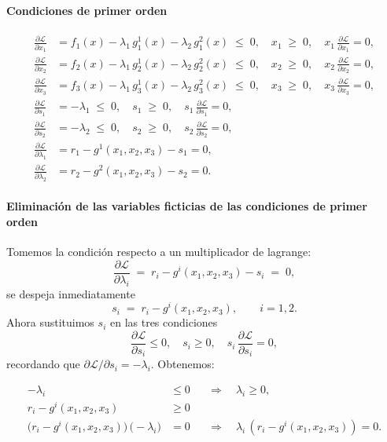 \documentclass{article}
\begin{document}
\bigskip
\paragraph{Condiciones de primer orden}

\[
\begin{aligned}
\frac{\partial\mathcal L}{\partial x_1}
&= f_{1}(x)-\lambda_1\,g^1_{1}(x)-\lambda_2\,g^2_{1}(x)
\;\le\;0,\quad
x_1\;\ge\;0,\quad
x_1\,\frac{\partial\mathcal L}{\partial x_1}=0,\\[6pt]
\frac{\partial\mathcal L}{\partial x_2}
&= f_{2}(x)-\lambda_1\,g^1_{2}(x)-\lambda_2\,g^2_{2}(x)
\;\le\;0,\quad
x_2\;\ge\;0,\quad
x_2\,\frac{\partial\mathcal L}{\partial x_2}=0,\\[6pt]
\frac{\partial\mathcal L}{\partial x_3}
&= f_{3}(x)-\lambda_1\,g^1_{3}(x)-\lambda_2\,g^2_{3}(x)
\;\le\;0,\quad
x_3\;\ge\;0,\quad
x_3\,\frac{\partial\mathcal L}{\partial x_3}=0,\\[6pt]
\frac{\partial\mathcal L}{\partial s_1}
&= -\lambda_1
\;\le\;0,\quad
s_1\;\ge\;0,\quad
s_1\,\frac{\partial\mathcal L}{\partial s_1}=0,\\[6pt]
\frac{\partial\mathcal L}{\partial s_2}
&= -\lambda_2
\;\le\;0,\quad
s_2\;\ge\;0,\quad
s_2\,\frac{\partial\mathcal L}{\partial s_2}=0,\\[6pt]
\frac{\partial\mathcal L}{\partial \lambda_1}
&= r_1 - g^1(x_1,x_2,x_3) - s_1 = 0,\\
\frac{\partial\mathcal L}{\partial \lambda_2}
&= r_2 - g^2(x_1,x_2,x_3) - s_2 = 0.
\end{aligned}
\]




\paragraph{Eliminación de las variables ficticias de las condiciones de primer orden\\}
Tomemos la condición respecto a un multiplicador de lagrange:
\[
\frac{\partial\mathcal L}{\partial \lambda_i}
\;=\;
r_i - g^i(x_1,x_2,x_3) - s_i
\;=\;0,
\]
se despeja inmediatamente
\[
s_i \;=\; r_i - g^i(x_1,x_2,x_3),
\qquad i=1,2.
\]
Ahora sustituimos \(s_i\) en las tres condiciones
\[
\frac{\partial\mathcal L}{\partial s_i}\le0,\quad
s_i\ge0,\quad
s_i\,\frac{\partial\mathcal L}{\partial s_i}=0,
\]
recordando que \(\partial\mathcal L/\partial s_i=-\lambda_i\). Obtenemos:

\[
\begin{aligned}
-\lambda_i &\le0
&&\Longrightarrow\quad \lambda_i\ge0,\\
r_i - g^i(x_1,x_2,x_3) &\ge0
&&\\
\bigl(r_i - g^i(x_1,x_2,x_3)\bigr)\,\bigl(-\lambda_i\bigr)&=0
&&\Longrightarrow\quad \lambda_i\,(r_i - g^i(x_1,x_2,x_3))=0.
\end{aligned}
\]
\end{document}
